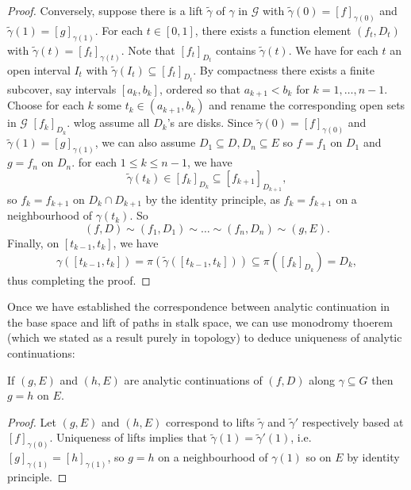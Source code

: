 \documentclass[a4paper]{article}
\begin{document}
\begin{proof}
  Conversely, suppose there is a lift \(\tilde \gamma\) of \(\gamma\) in \(\mathcal G\) with \(\tilde \gamma(0) = [f]_{\gamma(0)}\) and \(\tilde \gamma(1) = [g]_{\gamma(1)}\). For each \(t \in [0, 1]\), there exists a function element \((f_t, D_t)\) with \(\tilde \gamma(t) = [f_t]_{\gamma(t)}\). Note that \([f_t]_{D_t}\) contains \(\tilde \gamma(t)\). We have for each \(t\) an open interval \(I_t\) with \(\tilde \gamma(I_t) \subseteq [f_t]_{D_t}\). By compactness there exists a finite subcover, say intervals \([a_k, b_k]\), ordered so that \(a_{k + 1} < b_k\) for \(k = 1, \dots, n - 1\). Choose for each \(k\) some \(t_k \in (a_{k + 1}, b_k)\) and rename the corresponding open sets in \(\mathcal G\) \([f_k]_{D_k}\). wlog assume all \(D_k\)'s are disks. Since \(\tilde \gamma(0) = [f]_{\gamma(0)}\) and \(\tilde \gamma(1) = [g]_{\gamma(1)}\), we can also assume \(D_1 \subseteq D, D_n \subseteq E\) so \(f = f_1\) on \(D_1\) and \(g = f_n\) on \(D_n\). for each \(1 \leq k \leq n - 1\), we have
  \[
    \tilde \gamma(t_k) \in [f_k]_{D_k} \subseteq [f_{k + 1}]_{D_{k + 1}},
  \]
  so \(f_k = f_{k + 1}\) on \(D_k \cap D_{k + 1}\) by the identity principle, as \(f_k = f_{k + 1}\) on a neighbourhood of \(\gamma(t_k)\). So
  \[
    (f, D) \sim (f_1, D_1) \sim \dots \sim (f_n, D_n) \sim (g, E).
  \]
  Finally, on \([t_{k - 1}, t_k]\), we have
  \[
    \gamma([t_{k - 1}, t_k]) = \pi(\tilde \gamma([t_{k -1}, t_k])) \subseteq \pi([f_k]_{D_k}) = D_k,
  \]
  thus completing the proof.
\end{proof}

Once we have established the correspondence between analytic continuation in the base space and lift of paths in stalk space, we can use monodromy thoerem (which we stated as a result purely in topology) to deduce uniqueness of analytic continuations:

\begin{proposition}
  If \((g, E)\) and \((h, E)\) are analytic continuations of \((f, D)\) along \(\gamma \subseteq G\) then \(g = h\) on \(E\).
\end{proposition}

\begin{proof}
  Let \((g, E)\) and \((h, E)\) correspond to lifts \(\tilde \gamma\) and \(\tilde \gamma'\) respectively based at \([f]_{\gamma(0)}\). Uniqueness of lifts implies that \(\tilde \gamma(1) = \tilde \gamma'(1)\), i.e.\ \([g]_{\gamma(1)} = [h]_{\gamma(1)}\), so \(g = h\) on a neighbourhood of \(\gamma(1)\) so on \(E\) by identity principle.
\end{proof}
\end{document}
